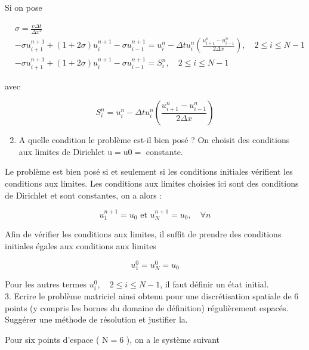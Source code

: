 \documentclass[10pt]{article}
\begin{document}
Si on pose

\[
\begin{aligned}
& \sigma=\frac{v \Delta t}{\Delta x^{2}} \\
& -\sigma u_{i+1}^{n+1}+(1+2 \sigma) u_{i}^{n+1}-\sigma u_{i-1}^{n+1}=u_{i}^{n}-\Delta t u_{i}^{n}\left(\frac{u_{i+1}^{n}-u_{i-1}^{n}}{2 \Delta x}\right), \quad 2 \leq i \leq N-1 \\
& -\sigma u_{i+1}^{n+1}+(1+2 \sigma) u_{i}^{n+1}-\sigma u_{i-1}^{n+1}=S_{i}^{n}, \quad 2 \leq i \leq N-1
\end{aligned}
\]

avec

\[
S_{i}^{n}=u_{i}^{n}-\Delta t u_{i}^{n}\left(\frac{u_{i+1}^{n}-u_{i-1}^{n}}{2 \Delta x}\right)
\]

\begin{enumerate}
  \setcounter{enumi}{1}
  \item A quelle condition le problème est-il bien posé ? On choisit des conditions aux limites de Dirichlet \(\mathrm{u}=\mathrm{u} 0=\) constante.
\end{enumerate}

Le problème est bien posé si et seulement si les conditions initiales vérifient les conditions aux limites. Les conditions aux limites choisies ici sont des conditions de Dirichlet et sont constantes, on a alors :

\[
u_{1}^{n+1}=u_{0} \text { et } u_{N}^{n+1}=u_{0}, \quad \forall n
\]

Afin de vérifier les conditions aux limites, il suffit de prendre des conditions initiales égales aux conditions aux limites

\[
u_{1}^{0}=u_{N}^{0}=u_{0}
\]

Pour les autres termes \(u_{i}^{0}, \quad 2 \leq i \leq N-1\), il faut définir un état initial.\\
3. Ecrire le problème matriciel ainsi obtenu pour une discrétisation spatiale de 6 points (y compris les bornes du domaine de définition) régulièrement espacés. Suggérer une méthode de résolution et justifier la.

Pour six points d'espace ( \(\mathrm{N}=6\) ), on a le système suivant
\end{document}
